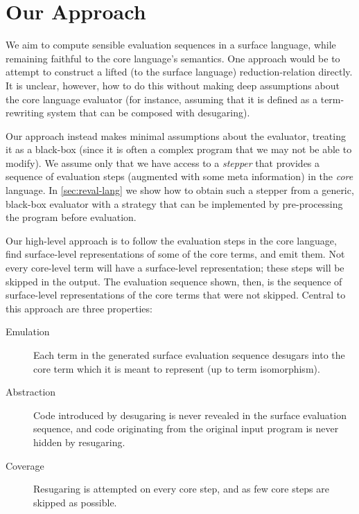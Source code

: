 \section{Our Approach}

We aim to compute sensible evaluation sequences in a surface language,
while remaining faithful to the core language's semantics.  One approach
would be to attempt to construct a lifted (to the surface language)
reduction-relation directly. It is unclear, however, how to do this
without making deep assumptions about the core language evaluator
(for instance, assuming that it is defined as a term-rewriting system that can be composed
with desugaring).

Our approach instead makes minimal assumptions about the
evaluator, treating it as a black-box (since it is often a complex
program that we may not be able to modify).
We assume only that we have access to a \emph{stepper} that
provides a sequence of evaluation steps (augmented with some
meta information) in the \emph{core} language. In 
\cref{sec:reval-lang} we show how to obtain such a stepper from a generic,
black-box
evaluator with a strategy that can be implemented by pre-processing
the program before evaluation.

Our high-level approach is to follow the evaluation steps in the core
language, find surface-level representations of some of the core
terms, and emit them. Not every core-level term will have a
surface-level representation; these steps will be skipped in the
output. The evaluation sequence shown, then, is the sequence of
surface-level representations of the core terms that were not
skipped. Central to this approach are three properties:

\begin{description}
\item[Emulation] Each term in the generated surface evaluation
  sequence desugars into the core term which it is meant to represent
  (up to term isomorphism).
\item[Abstraction] Code introduced by desugaring is never revealed in the
  surface evaluation sequence, and code originating from the original
  input program is never hidden by resugaring.
\item[Coverage] Resugaring is attempted on every core step, and as few
  core steps are skipped as possible.
\end{description}

